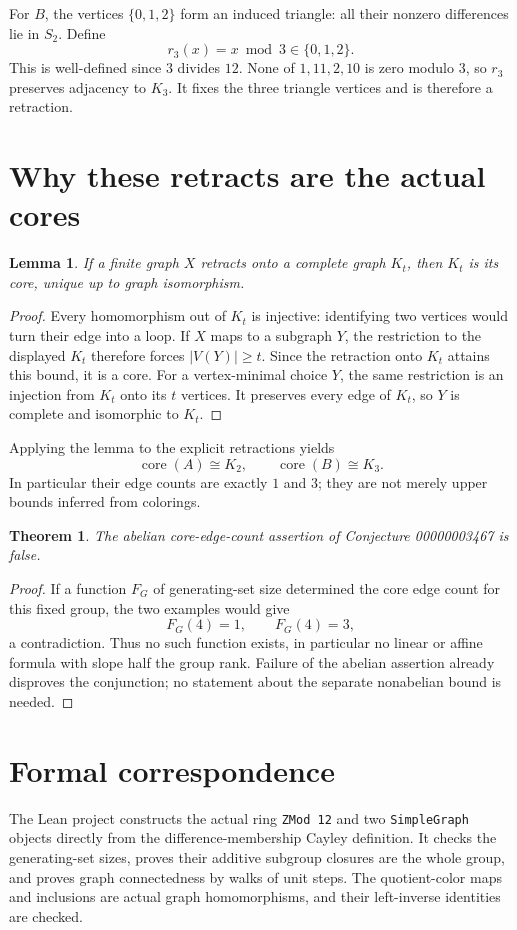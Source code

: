 \documentclass[11pt]{article}
\newtheorem{theorem}{Theorem}
\newtheorem{lemma}{Lemma}
\begin{document}
For $B$, the vertices $\{0,1,2\}$ form an induced triangle: all their
nonzero differences lie in $S_2$. Define
\[
 r_3(x)=x\bmod3\in\{0,1,2\}.
\]
This is well-defined since $3$ divides $12$. None of $1,11,2,10$ is
zero modulo $3$, so $r_3$ preserves adjacency to $K_3$.
It fixes the three triangle vertices and is therefore a retraction.

\section*{Why these retracts are the actual cores}
\begin{lemma}
If a finite graph $X$ retracts onto a complete graph $K_t$, then $K_t$
is its core, unique up to graph isomorphism.
\end{lemma}
\begin{proof}
Every homomorphism out of $K_t$ is injective: identifying two vertices
would turn their edge into a loop. If $X$ maps to a subgraph $Y$, the
restriction to the displayed $K_t$ therefore forces $|V(Y)|\ge t$.
Since the retraction onto $K_t$ attains this bound, it is a core.
For a vertex-minimal choice $Y$, the same restriction is an injection
from $K_t$ onto its $t$ vertices. It preserves every edge of $K_t$,
so $Y$ is complete and isomorphic to $K_t$.
\end{proof}

Applying the lemma to the explicit retractions yields
\[
 \operatorname{core}(A)\cong K_2,\qquad
 \operatorname{core}(B)\cong K_3.
\]
In particular their edge counts are exactly $1$ and $3$; they are not
merely upper bounds inferred from colorings.

\begin{theorem}
The abelian core-edge-count assertion of Conjecture 00000003467 is false.
\end{theorem}
\begin{proof}
If a function $F_G$ of generating-set size determined the core edge
count for this fixed group, the two examples would give
\[
          F_G(4)=1,\qquad F_G(4)=3,
\]
a contradiction. Thus no such function exists, in particular no
linear or affine formula with slope half the group rank. Failure of
the abelian assertion already disproves the conjunction; no statement
about the separate nonabelian bound is needed.
\end{proof}

\section*{Formal correspondence}
The Lean project constructs the actual ring \texttt{ZMod 12} and two
\texttt{SimpleGraph} objects directly from the difference-membership
Cayley definition. It checks the generating-set sizes, proves their
additive subgroup closures are the whole group, and proves graph
connectedness by walks of unit steps. The quotient-color maps and
inclusions are actual graph homomorphisms, and their left-inverse
identities are checked.
\end{document}
